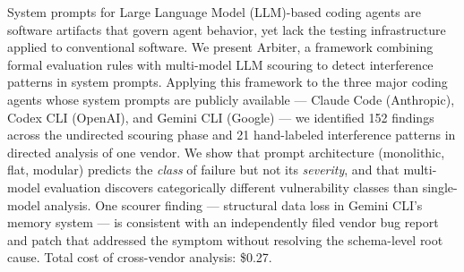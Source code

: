 System prompts for Large Language Model (LLM)-based
coding agents are software artifacts that govern agent behavior, yet
lack the testing infrastructure applied to conventional software. We
present Arbiter, a framework combining formal evaluation rules with
multi-model LLM scouring to detect interference patterns in system
prompts. Applying this framework to the three major coding agents whose
system prompts are publicly available --- Claude Code (Anthropic), Codex
CLI (OpenAI), and Gemini CLI (Google) --- we identified 152 findings
across the undirected scouring phase and 21 hand-labeled interference
patterns in directed analysis of one vendor. We show that prompt
architecture (monolithic, flat, modular) predicts the \emph{class} of
failure but not its \emph{severity}, and that multi-model evaluation
discovers categorically different vulnerability classes than
single-model analysis. One scourer finding --- structural data loss in
Gemini CLI's memory system --- is consistent with an independently filed
vendor bug report and patch that addressed the symptom without resolving
the schema-level root cause. Total cost of cross-vendor analysis:
\$0.27.
